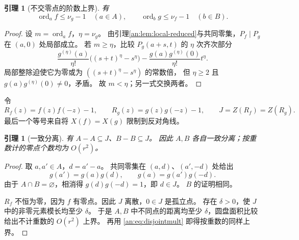 \documentclass[11pt,a4paper,oneside,openany]{book}
\theoremstyle{lecture}
\newtheorem{lemma}[theorem]{引理}
\newcommand{\ord}{\operatorname{ord}}
\numberwithin{equation}{section}
\begin{document}
\begin{lemma}[不交零点的阶数上界]\label{an:lem:disjoint-mult}
有
\begin{equation}\label{an:eq:disjointmult}
 \ord_a f\le\nu_g-1\quad(a\in A),\qquad
 \ord_b g\le\nu_f-1\quad(b\in B).
\end{equation}
\end{lemma}
\begin{proof}
设 $m=\ord_a f$，$\eta=\nu_g$。
由引理\ref{an:lem:local-reduced}与共同零集，$P_f\mid P_g$ 在 $(a,0)$ 处局部成立。
若 $m\ge \eta$，比较 $P_g(a+s,t)$ 的 $\eta$ 次齐次部分
\[
 \frac{g^{(\eta)}(a)}{\eta!}\bigl((s+t)^\eta-s^\eta\bigr)
 -\frac{g(a)g^{(\eta)}(0)}{\eta!}t^\eta.
\]
局部整除迫使它为零或为 $((s+t)^\eta-s^\eta)$ 的常数倍，
但 $\eta\ge2$ 且 $g(a)g^{(\eta)}(0)\ne0$，矛盾。
故 $m<\eta$；另一式交换两者。
\end{proof}

令
\begin{equation}\label{an:eq:R-J}
 R_f(z)=f(z)f(-z)-1,\qquad R_g(z)=g(z)g(-z)-1,
 \qquad J=Z(R_f)=Z(R_g).
\end{equation}
最后一个等号来自将 $X(f)=X(g)$ 限制到反对角线。

\begin{lemma}[一致分离]\label{an:lem:separation}
有 $A-A\subseteq J$、$B-B\subseteq J$。
因此 $A,B$ 各自一致分离；按重数计的零点个数均为 $O(r^2)$。
\end{lemma}
\begin{proof}
取 $a,a'\in A$，$d=a'-a$。
共同零集在 $(a,d)$、$(a',-d)$ 处给出
\[
 g(a')=g(a)g(d),\qquad g(a)=g(a')g(-d).
\]
由于 $A\cap B=\varnothing$，相消得 $g(d)g(-d)=1$，即 $d\in J$。
$B$ 的证明相同。

$R_f$ 不恒为零，因为 $f$ 有零点。因此 $J$ 离散，$0\in J$ 是孤立点。
存在 $\delta>0$，使 $J$ 中的非零元素模长均至少 $\delta$。
于是 $A,B$ 中不同点的距离均至少 $\delta$，圆盘面积比较给出不计重数的 $O(r^2)$ 上界。
再用 \eqref{an:eq:disjointmult} 即得按重数的同样上界。
\end{proof}
\end{document}
